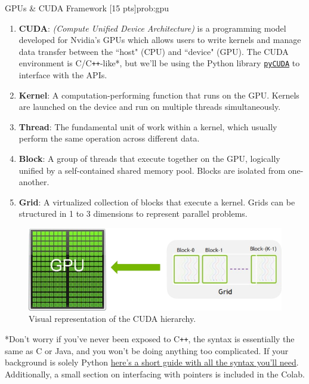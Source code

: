 \begin{problem}{GPUs \& CUDA Framework \hfill[15 pts]}{prob:gpu}
    \begin{enumerate}
        \item \textbf{CUDA}: \textit{(Compute Unified Device Architecture)} is a programming model developed for Nvidia's GPUs which allows users to write kernels and manage data transfer between the ``host" (CPU) and ``device" (GPU). The CUDA environment is C/C\texttt{++}-like*, but we'll be using the Python library \href{https://pypi.org/project/pycuda/#description}{\tt pyCUDA} to interface with the APIs.
        \item \textbf{Kernel}: A computation-performing function that runs on the GPU. Kernels are launched on the device and run on multiple threads simultaneously. 
        \item \textbf{Thread}: The fundamental unit of work within a kernel, which usually perform the same operation across different data. 
        \item \textbf{Block}: A group of threads that execute together on the GPU, logically unified by a self-contained shared memory pool. Blocks are isolated from one-another. 
        \item \textbf{Grid}: A virtualized collection of blocks that execute a kernel. Grids can be structured in 1 to 3 dimensions to represent parallel problems.
    \end{enumerate}
        \begin{figure}[H]
        \centering
        \includegraphics[width=\linewidth]{media/viz_blocks_grid.png}
        \caption{Visual representation of the CUDA hierarchy. \cite{Gupta_2023}}
        \label{cuda diagram}
    \end{figure}
    *Don't worry if you've never been exposed to C\texttt{++}, the syntax is essentially the same as C or Java, and you won't be doing anything too complicated. If your background is solely Python \href{https://web.stanford.edu/class/archive/cs/cs106b/cs106b.1252/resources/python_to_cpp.html}{here's a short guide with all the syntax you'll need}. Additionally, a small section on interfacing with pointers is included in the Colab.


\end{problem}
